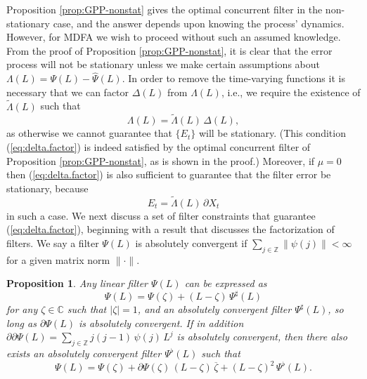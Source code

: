 \documentclass[a4paper]{book}
\def\ZZ{\mathbb Z}
\def\CC{\mathbb C}
\newtheorem{Proposition}{Proposition}
\begin{document}

 
\vspace{.5cm}

 Proposition  \ref{prop:GPP-nonstat} gives the optimal concurrent filter in 
  the non-stationary case, and the answer depends upon knowing the process'
   dynamics.  However, for MDFA we wish to proceed without such an assumed
   knowledge.   From the proof of Proposition  \ref{prop:GPP-nonstat}, it
  is clear that  the error process will  
 not be stationary unless we make certain assumptions
 about $\Lambda (L) = \Psi (L) - \widehat{\Psi} (L)$.    
 In order to remove the time-varying functions it is necessary that 
 we can factor $\Delta (L)$ from $\Lambda (L)$, i.e., we require the existence of
 $\widetilde{\Lambda } (L)$ such that
\begin{equation}
 \label{eq:delta.factor}
  \Lambda (L) = \widetilde{\Lambda } (L) \, \Delta (L),
\end{equation}
 as otherwise we cannot guarantee that $\{ E_t \}$ will be stationary. 
 (This condition (\ref{eq:delta.factor}) is indeed satisfied by the optimal 
 concurrent filter of Proposition \ref{prop:GPP-nonstat}, as is shown in the 
  proof.)  Moreover, if $\mu =0$ then (\ref{eq:delta.factor}) is also 
  sufficient to guarantee
 that the filter error be stationary, because
\[
  E_t = \widetilde{\Lambda} (L) \, \partial X_t
\]
 in such a case.   We next discuss a set of filter 
 constraints that guarantee (\ref{eq:delta.factor}), beginning with a result
 that discusses the factorization of filters.  
 We say a filter $\Psi (L)$ is absolutely convergent 
 if $\sum_{j \in \ZZ} \| \psi (j) \| < \infty$
 for a given matrix norm $\| \cdot \|$.

\begin{Proposition}
\label{prop:filter-decompose}
 Any linear filter $\Psi (L)$ can be expressed as
\[
  \Psi (L) = \Psi (\zeta) + (L - \zeta) \, \Psi^{\sharp} (L)
\]
 for any $\zeta \in \CC$  such that $| \zeta | = 1$,
  and an absolutely convergent filter $\Psi^{\sharp} (L)$,
  so long as  $\partial \Psi (L) $ is absolutely convergent.
 If in addition $ \partial \partial \Psi (L) =
 \sum_{ j \in \ZZ} j (j-1) \, \psi (j) \, L^j$
   is absolutely convergent, then there also exists an absolutely
   convergent filter $\Psi^{\flat} (L)$  such that
\[
 \Psi (L) = \Psi (\zeta) + \partial \Psi (\zeta) \, 
 (L- \zeta) \, \overline{\zeta} + {(L - \zeta)}^2 \, \Psi^{\flat} (L).
\]
\end{Proposition}
\end{document}

